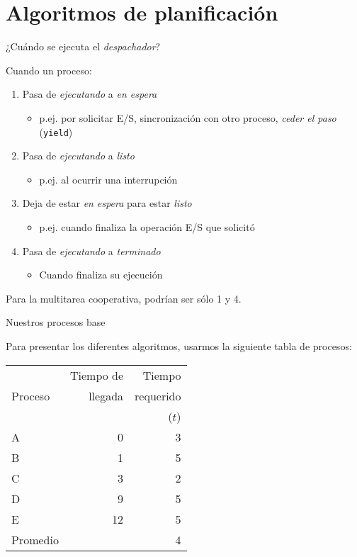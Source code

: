 \documentclass[presentation]{beamer}
\begin{document}
\section{Algoritmos de planificación}
\label{sec:org4a64f62}
\begin{frame}[label={sec:orgd641976},fragile]{¿Cuándo se ejecuta el \emph{despachador}?}
 \begin{center}
Cuando un proceso:
\end{center}
\begin{enumerate}
\item Pasa de \emph{ejecutando} a \emph{en espera}
\begin{itemize}
\item p.ej. por solicitar E/S, sincronización con otro proceso, \emph{ceder
el paso} (\texttt{yield})
\end{itemize}
\item Pasa de \emph{ejecutando} a \emph{listo}
\begin{itemize}
\item p.ej. al ocurrir una interrupción
\end{itemize}
\item Deja de estar \emph{en espera} para estar \emph{listo}
\begin{itemize}
\item p.ej. cuando finaliza la operación E/S que solicitó
\end{itemize}
\item Pasa de \emph{ejecutando} a \emph{terminado}
\begin{itemize}
\item Cuando finaliza su ejecución
\end{itemize}
\end{enumerate}
\begin{center}
Para la multitarea cooperativa, podrían ser sólo 1 y 4.
\end{center}
\end{frame}
\begin{frame}[label={sec:org989df08}]{Nuestros procesos base}
\begin{center}
Para presentar los diferentes algoritmos, usarmos la siguiente tabla
de procesos:

\begin{center}
\begin{tabular}{lrr}
 & Tiempo de & Tiempo\\
Proceso & llegada & requerido\\
 &  & (\(t\))\\
\hline
A & 0 & 3\\
B & 1 & 5\\
C & 3 & 2\\
D & 9 & 5\\
E & 12 & 5\\
Promedio &  & 4\\
\end{tabular}
\end{center}
\end{center}
\end{frame}
\end{document}
